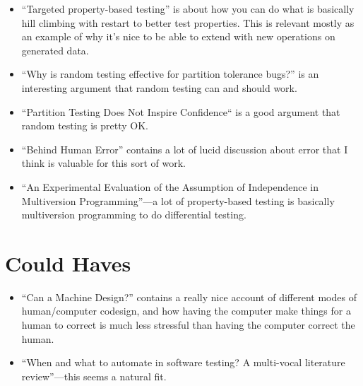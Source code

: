 \begin{itemize}
\item ``Targeted property-based testing''\cite{DBLP:conf/issta/LoscherS17} is about how you can do what is basically hill climbing with restart to better test properties.
This is relevant mostly as an example of why it's nice to be able to extend with new operations on generated data.
\item ``Why is random testing effective for partition tolerance bugs?''\cite{DBLP:journals/pacmpl/MajumdarN18} is an interesting argument that random testing can and should work.
\item ``Partition Testing Does Not Inspire Confidence``\cite{DBLP:journals/tse/HamletT90} is a good argument that random testing is pretty OK.
\item ``Behind Human Error''\cite{BehindHumanError} contains a lot of lucid discussion about error that I think is valuable for this sort of work.
\item ``An Experimental Evaluation of the Assumption of Independence in Multiversion Programming''\cite{DBLP:journals/tse/KnightL86}---a
lot of property-based testing is basically multiversion programming to do differential testing.
\end{itemize}

\section{Could Haves}

\begin{itemize}
\item ``Can a Machine Design?''\cite{doi:10.1162/07479360152681083} contains a really nice account of different modes of human/computer codesign,
and how having the computer make things for a human to correct is much less stressful than having the computer correct the human.
\item ``When and what to automate in software testing? {A} multi-vocal literature review''\cite{DBLP:journals/infsof/GarousiM16}---this
seems a natural fit.
\end{itemize}




